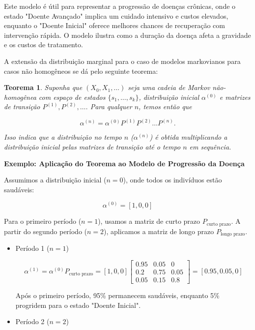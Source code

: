 \documentclass[12pt]{article}
\theoremstyle{break}
\newtheorem{theorem}{Teorema}[section]
\begin{document}
Este modelo é útil para representar a progressão de doenças crônicas, onde o estado "Doente Avançado" implica um cuidado intensivo e custos elevados, enquanto o "Doente Inicial" oferece melhores chances de recuperação com intervenção rápida. O modelo ilustra como a duração da doença afeta a gravidade e os custos de tratamento.








A extensão da distribuição marginal para o caso de modelos markovianos para casos não homogêneos se dá pelo seguinte teorema:




\begin{theorem}
Suponha que \( (X_0, X_1, \dots) \) seja uma cadeia de Markov não-homogênea com espaço de estados \( \{s_1, \dots, s_k\} \), distribuição inicial \( \alpha^{(0)} \) e matrizes de transição \( P^{(1)}, P^{(2)}, \dots \). Para qualquer \( n \), temos então que

\[
\alpha^{(n)} = \alpha^{(0)} P^{(1)} P^{(2)} \dots P^{(n)}.
\]

Isso indica que a distribuição no tempo \( n \) (\( \alpha^{(n)} \)) é obtida multiplicando a distribuição inicial pelas matrizes de transição até o tempo \( n \) em sequência.
\end{theorem}




\textbf{Exemplo: Aplicação do Teorema ao Modelo de Progressão da Doença}

Assumimos a distribuição inicial (\( n = 0 \)), onde todos os indivíduos estão saudáveis:

\[
\alpha^{(0)} = [1, 0, 0]
\]

Para o primeiro período (\( n = 1 \)), usamos a matriz de curto prazo \( P_{\text{curto prazo}} \). A partir do segundo período (\( n = 2 \)), aplicamos a matriz de longo prazo \( P_{\text{longo prazo}} \).

\begin{itemize}
    \item Período 1 (\( n = 1 \))

\[
\alpha^{(1)} = \alpha^{(0)} P_{\text{curto prazo}} = [1, 0, 0] \begin{bmatrix} 0.95 & 0.05 & 0 \\ 0.2 & 0.75 & 0.05 \\ 0.05 & 0.15 & 0.8 \end{bmatrix} = [0.95, 0.05, 0]
\]

Após o primeiro período, 95\% permanecem saudáveis, enquanto 5\% progridem para o estado "Doente Inicial".



\item Período 2 (\( n = 2 \))

\end{itemize}
\end{document}
